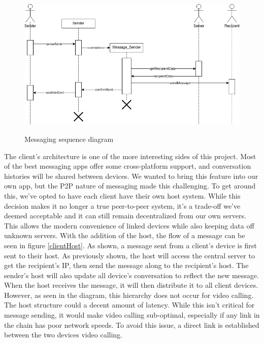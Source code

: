 \documentclass[titlepage]{article}
\begin{document}
      \begin{center}
          \begin{figure}[!ht]
              \includegraphics[scale=.5]{graphics/SequenceDiagram.png}
              \label{sequence}
              \caption{Messaging sequence diagram}
          \end{figure}
      \end{center}

      The client's architecture is one of the more interesting sides of this project.
      Most of the best messaging apps offer some cross-platform support, and conversation histories will be shared between devices.
      We wanted to bring this feature into our own app, but the P2P nature of messaging made this challenging.
      To get around this, we've opted to have each client have their own host system.
      While this decision makes it no longer a true peer-to-peer system, it's a trade-off we've deemed acceptable and it can still remain decentralized from our own servers.
      This allows the modern convenience of linked devices while also keeping data off unknown servers.
      With the addition of the host, the flow of a message can be seen in figure \ref{clientHost}.
      As shown, a message sent from a client's device is first sent to their host.
      As previously shown, the host will access the central server to get the recipient's IP, then send the message along to the recipient's host.
      The sender's host will also update all device's conversation to reflect the new message.
      When the host receives the message, it will then distribute it to all client devices.
      However, as seen in the diagram, this hierarchy does not occur for video calling.
      The host structure could a decent amount of latency.
      While this isn't critical for message sending, it would make video calling sub-optimal, especially if any link in the chain has poor network speeds.
      To avoid this issue, a direct link is established between the two devices video calling.
\end{document}
